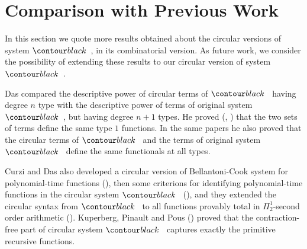 \section{Comparison with Previous Work}
\label{section-comparison}

In this section we quote more results obtained about the circular versions of system $\systemT$,
in its combinatorial version. As future work, we consider the possibility of extending these results
to our circular version of system $\systemT$.

Das compared the descriptive power of circular terms of $\systemT$ 
having degree $n$ type with the descriptive power of terms of original system $\systemT$,
but having degree $n+1$ types. 
He proved (\cite{2021-Anupam-Das}, \cite{DBLP:conf/fscd/000221})
that the two sets of terms define the same type $1$ functions. In the same papers he also proved 
that the circular terms of $\systemT$ and the terms of original system $\systemT$ 
define the same functionals at all types.

Curzi and Das also developed a circular version of Bellantoni-Cook system for 
polynomial-time functions (\cite{DBLP:conf/lics/Curzi022}), 
then some criterions for identifying polynomial-time functions
in the circular system $\systemT$ (\cite{DBLP:conf/csl/Curzi023}),
and they extended the circular syntax from $\systemT$ to all functions provably total in 
$\Pi^1_2$-second order arithmetic (\cite{DBLP:conf/lics/Curzi023}).
Kuperberg, Pinault and Pous (\cite{2021-Kuperberg-Pinault-Pous})
proved that the contraction-free part of circular system $\systemT$
captures exactly the primitive recursive functions.
